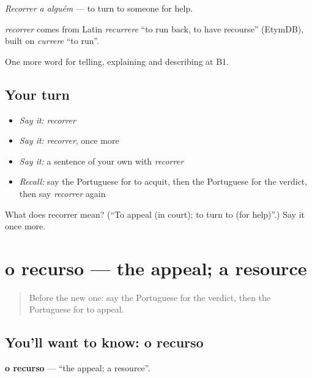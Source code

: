 \emph{Recorrer a alguém} — to turn to someone for help.

\begin{cousinweb}
\emph{recorrer} comes from Latin \emph{recurrere} \textquotedblleft{}to run back, to have recourse\textquotedblright{} (EtymDB), built on \emph{currere} \textquotedblleft{}to run\textquotedblright{}.
\end{cousinweb}

\begin{grammarlens}[title={What you've built}]
One more word for telling, explaining and describing at B1.
\end{grammarlens}

\subsection*{Your turn}
\begin{itemize}
\raggedright
  \item \emph{Say it:} \emph{recorrer}
  \item \emph{Say it:} \emph{recorrer}, once more
  \item \emph{Say it:} a sentence of your own with \emph{recorrer}
  \item \emph{Recall:} say the Portuguese for to acquit, then the Portuguese for the verdict, then say \emph{recorrer} again
\end{itemize}

\begin{tcolorbox}[breakable,colback=teal!4,colframe=teal!35!black,title={Before you move on}]
What does recorrer mean? (\textquotedblleft{}To appeal (in court); to turn to (for help)\textquotedblright{}.) Say it once more.
\end{tcolorbox}
\section[o recurso]{o recurso — the appeal; a resource}

\label{lesson:PT-C298-recurso}



\begin{quote}
Before the new one: say the Portuguese for the verdict, then the Portuguese for to appeal.
\end{quote}

\subsection*{You'll want to know: o recurso}
\textbf{o recurso} — \textquotedblleft{}the appeal; a resource\textquotedblright{}.

